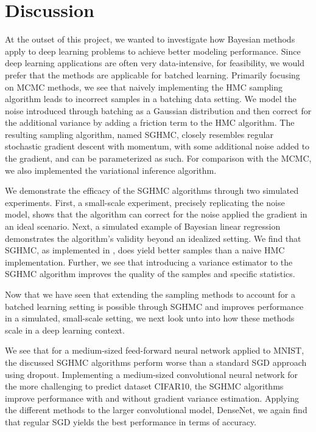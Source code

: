 \chapter{Discussion}

At the outset of this project, we wanted to investigate how  Bayesian methods apply to deep learning problems to achieve better modeling performance.
Since deep learning applications are often very data-intensive, for feasibility, we would prefer that the methods are applicable for batched learning. 
Primarily focusing on MCMC methods, we see that naively implementing the HMC sampling algorithm leads to incorrect samples in a batching data setting.
We model the noise introduced through batching as a Gaussian distribution and then correct for the additional variance by adding a friction term to the HMC algorithm. 
The resulting sampling algorithm, named SGHMC, closely resembles regular stochastic gradient descent with momentum, with some additional noise added to the gradient, and can be parameterized as such.
For comparison with the MCMC, we also implemented the variational inference algorithm.

We demonstrate the efficacy of the SGHMC algorithms through two simulated experiments. 
First, a small-scale experiment, precisely replicating the noise model, shows that the algorithm can correct for the noise applied the gradient in an ideal scenario. 
Next, a simulated example of Bayesian linear regression demonstrates the algorithm's validity beyond an idealized setting.  
We find that SGHMC, as implemented in \autocite{chen_stochastic_2014}, does yield better samples than a naive HMC implementation. 
Further, we see that introducing a variance estimator to the SGHMC algorithm improves the quality of the samples and specific statistics. 

Now that we have seen that extending the sampling methods to account for a batched learning setting is possible through SGHMC and improves performance in a simulated, small-scale setting, we next look unto into how these methods scale in a deep learning context.

We see that for a medium-sized feed-forward neural network applied to MNIST, the discussed SGHMC algorithms perform worse than a standard SGD approach using dropout. 
Implementing a medium-sized convolutional neural network for the more challenging to predict dataset CIFAR10, the SGHMC algorithms improve performance with and without gradient variance estimation. 
Applying the different methods to the larger convolutional model, DenseNet, we again find that regular SGD yields the best performance in terms of accuracy. 

